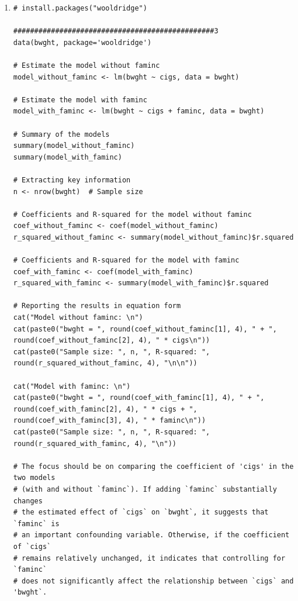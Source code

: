 \documentclass[12pt]{article}
\begin{document}
\begin{enumerate}
{\begin{enumerate}
\begin{itemize}
    \item **Positive Correlation:** On the other hand, it is possible that some wealthier families might have habits that include smoking, leading to a positive correlation. However, this is less likely in the context of prenatal care.
\end{itemize}

Overall, it is more reasonable to expect a **negative correlation** between \textit{cigs} and \textit{faminc}, given that higher income is usually associated with better awareness of the risks of smoking during pregnancy.

\item 

\begin{lstlisting}
# install.packages("wooldridge")

################################################3
data(bwght, package='wooldridge')

# Estimate the model without faminc
model_without_faminc <- lm(bwght ~ cigs, data = bwght)

# Estimate the model with faminc
model_with_faminc <- lm(bwght ~ cigs + faminc, data = bwght)

# Summary of the models
summary(model_without_faminc)
summary(model_with_faminc)

# Extracting key information
n <- nrow(bwght)  # Sample size

# Coefficients and R-squared for the model without faminc
coef_without_faminc <- coef(model_without_faminc)
r_squared_without_faminc <- summary(model_without_faminc)$r.squared

# Coefficients and R-squared for the model with faminc
coef_with_faminc <- coef(model_with_faminc)
r_squared_with_faminc <- summary(model_with_faminc)$r.squared

# Reporting the results in equation form
cat("Model without faminc: \n")
cat(paste0("bwght = ", round(coef_without_faminc[1], 4), " + ", round(coef_without_faminc[2], 4), " * cigs\n"))
cat(paste0("Sample size: ", n, ", R-squared: ", round(r_squared_without_faminc, 4), "\n\n"))

cat("Model with faminc: \n")
cat(paste0("bwght = ", round(coef_with_faminc[1], 4), " + ", round(coef_with_faminc[2], 4), " * cigs + ", round(coef_with_faminc[3], 4), " * faminc\n"))
cat(paste0("Sample size: ", n, ", R-squared: ", round(r_squared_with_faminc, 4), "\n"))

# The focus should be on comparing the coefficient of 'cigs' in the two models 
# (with and without `faminc`). If adding `faminc` substantially changes 
# the estimated effect of `cigs` on `bwght`, it suggests that `faminc` is 
# an important confounding variable. Otherwise, if the coefficient of `cigs` 
# remains relatively unchanged, it indicates that controlling for `faminc` 
# does not significantly affect the relationship between `cigs` and 'bwght`.
\end{lstlisting}
\end{enumerate}

}
\end{enumerate}
\end{document}
